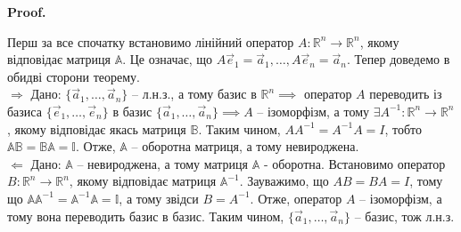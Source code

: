 \documentclass[a4paper, 10pt]{article}
\makeatletter
\def\rightproof{$\boxed{\Rightarrow}$ }
\def\leftproof{$\boxed{\Leftarrow}$ }
\theoremstyle{theoremdd}
\renewenvironment{proof}[1][Proof.\\]{\par
\pushQED{\hfill \qed}%
\normalfont \topsep6\p@\@plus6\p@\relax
\trivlist
\item\relax
{\bfseries
#1\@addpunct{.}}\hspace\labelsep\ignorespaces
}{%
\popQED\endtrivlist\@endpefalse
}
\makeatother
\begin{document}
\begin{proof}
Перш за все спочатку встановимо лінійний оператор $A \colon \mathbb{R}^n \to \mathbb{R}^n$, якому відповідає матриця $\mathbb{A}$. Це означає, що $A\vec{e}_1 = \vec{a}_1,\dots, A\vec{e}_n = \vec{a}_n$. Тепер доведемо в обидві сторони теорему.
\bigskip \\
\rightproof Дано: $\{\vec{a}_1,\dots,\vec{a}_n \}$ -- л.н.з., а тому базис в $\mathbb{R}^n \implies$ оператор $A$ переводить із базиса $\{\vec{e}_1,\dots,\vec{e}_n\}$ в базис $\{\vec{a}_1,\dots,\vec{a}_n\} \implies A$ -- ізоморфізм, а тому $\exists A^{-1} \colon \mathbb{R}^n \to \mathbb{R}^n$, якому відповідає якась матриця $\mathbb{B}$. Таким чином, $AA^{-1} = A^{-1}A = I$, тобто $\mathbb{A} \mathbb{B} = \mathbb{B} \mathbb{A} = \mathbb{I}$. Отже, $\mathbb{A}$ -- оборотна матриця, а тому невироджена.
\bigskip \\
\leftproof Дано: $\mathbb{A}$ -- невироджена, а тому матриця $\mathbb{A}$ - оборотна. Встановимо оператор $B \colon \mathbb{R}^n \to \mathbb{R}^n$, якому відповідає матриця $\mathbb{A}^{-1}$. Зауважимо, що $AB = BA = I$, тому що $\mathbb{A} \mathbb{A}^{-1} = \mathbb{A}^{-1} \mathbb{A} = \mathbb{I}$, а тому звідси $B = A^{-1}$. Отже, оператор $A$ -- ізоморфізм, а тому вона переводить базис в базис. Таким чином, $\{\vec{a}_1,\dots,\vec{a}_n \}$ -- базис, тож л.н.з.
\end{proof}

\iffalse
\begin{proof}
$\{\vec{a}_1,\dots,\vec{a}_n\}$ - л.н.з. $\iff$ $\{\vec{a}_1,\dots,\vec{a}_n\}$ - базис в $\mathbb{R}^n \iff \mathbb{A} = (\vec{a}_1,\dots,\vec{a}_n)$ задає ізоморфізм \\ $A: \mathbb{R}^n \to \mathbb{R}^n$ із $\{\vec{e_1},\dots,\vec{e_n}\}$ в $\{\vec{a_1},\dots,\vec{a_n} \}$ $\iff$ має обернений $A^{-1} \iff \det \mathbb{A} \neq 0$.
\end{proof}
\fi
\end{document}
